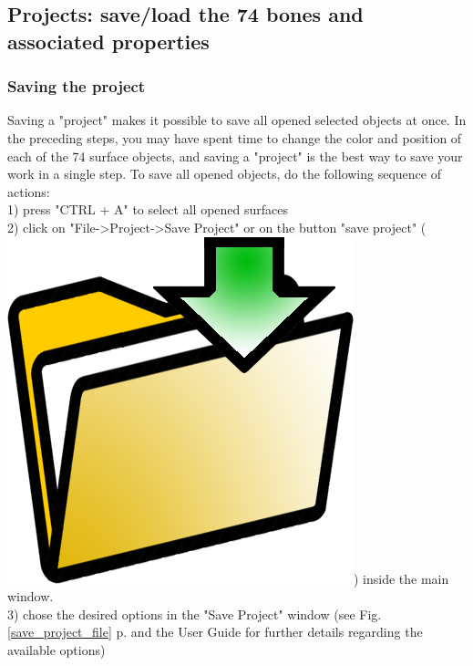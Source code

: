\documentclass[12pt, a4paper]{book}
\begin{document}
\subsection{Projects: save/load the 74 bones and associated properties}
\subsubsection{Saving the project}
Saving a "project" makes it possible to save all opened selected objects at once. In the preceding steps, you may have spent time to change the color and position of each of the 74 surface objects, and saving a "project" is the best way to save your work in a single step. 
To save all opened objects, do the following sequence of actions:\\
1) press "CTRL + A" to select all opened surfaces\\
2) click on "File->Project->Save Project" or on the button "save project" (\includegraphics[scale=0.03]{../images/03/save_data.png})  inside the main window.\\
3) chose the desired options in the "Save Project" window (see Fig. \ref{save_project_file} p.\pageref{save_project_file} and the User Guide for further details regarding the available options)
\end{document}
